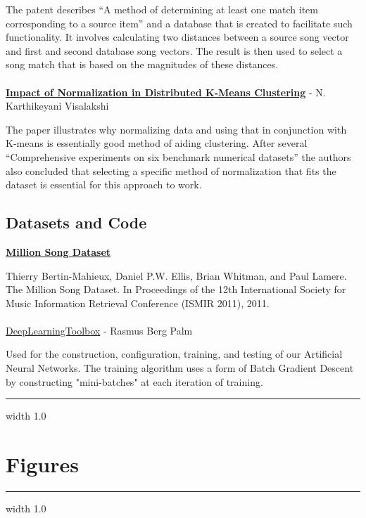 \documentclass[12pt]{article}
\newcommand{\horizontalLine}{
	\begin{center}
		\hrule width 1.0\textwidth
	\end{center}
}
\begin{document}
The patent describes  ``A method of determining at least one match item corresponding to a source item'' and a database that is created to facilitate such functionality. It involves calculating two distances between a source song vector and  first and second database song vectors. The result is then used to select a song match that is based on the magnitudes of these distances.
\\
\\
\href{http://www.medwelljournals.com/fulltext/?doi=ijscomp.2009.168.172}{\textbf{Impact of Normalization in Distributed K-Means Clustering}} - N. Karthikeyani Visalakshi 

The paper illustrates why normalizing data and using that in conjunction with K-means is essentially good method of aiding clustering. After several ``Comprehensive experiments on six benchmark numerical datasets'' the authors also concluded that selecting a specific method of normalization that fits the dataset is essential for this approach to work.

\subsection{Datasets and Code}
\href{http://labrosa.ee.columbia.edu/millionsong/}{\textbf{Million Song Dataset}}

Thierry Bertin-Mahieux, Daniel P.W. Ellis, Brian Whitman, and Paul Lamere. 
The Million Song Dataset. In Proceedings of the 12th International Society
for Music Information Retrieval Conference (ISMIR 2011), 2011.
\\
\\
\href{https://github.com/rasmusbergpalm/DeepLearnToolbox}{DeepLearningToolbox} - Rasmus Berg Palm

Used for the construction, configuration, training, and testing of our Artificial Neural Networks. The training algorithm uses a form of Batch Gradient Descent by constructing "mini-batches" at each iteration of training.

\appendix

\horizontalLine
\section{Figures}
\label{sec:figures}

\horizontalLine
\end{document}
